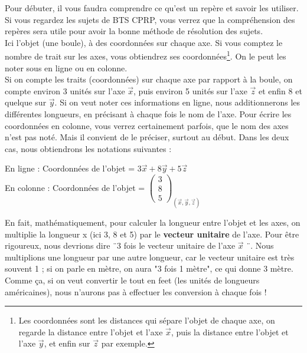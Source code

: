 \documentclass[
	11pt, %
	fleqn, %
	a4paper, %
]{LegrandOrangeBook}
\begin{document}
Pour débuter, il vous faudra comprendre ce qu'est un repère et savoir les utiliser. Si vous regardez les sujets de BTS CPRP, vous verrez que la compréhension des repères sera utile pour avoir la bonne méthode de résolution des sujets.\\


Ici l'objet (une boule), à des coordonnées sur chaque axe. Si vous comptez le {\color{blue} nombre de trait} sur les axes, vous obtiendrez ses coordonnées\footnote{Les coordonnées sont les distances qui sépare l'objet de chaque axe, on regarde la distance entre l'objet et l'axe $\vec{x}$, puis la distance entre l'objet et l'axe $\vec{y}$, et enfin sur $\vec{z}$ par exemple.}. On le peut les noter sous en ligne ou en colonne.\\


Si on compte les traits (coordonnées) sur chaque axe par rapport à la boule, on compte environ 3 unités sur l'axe $\vec{x}$, puis environ 5 unités sur l'axe $\vec{z}$ et enfin 8 et quelque sur $\vec{y}$. Si on veut noter ces informations en ligne, nous additionnerons les différentes longueurs, en précisant à chaque fois le nom de l'axe. Pour écrire les coordonnées en colonne, vous verrez certainement parfois, que le nom des axes n'est pas noté. Mais il convient de le préciser, surtout au début. Dans les deux cas, nous obtiendrons les notations suivantes :

\begin{center}
    



En ligne : Coordonnées de l'objet = $3\vec{x} + 8\vec{y} + 5\vec{z}$ \\
En colonne : Coordonnées de l'objet = {$\begin{pmatrix}
3\\
8\\
5
\end{pmatrix}_{(\vec{x} ,\vec{y} ,\vec{z})}$}



\end{center}

\begin{remark}
    En fait, mathématiquement, pour calculer la longueur entre l'objet et les axes, on multiplie la longueur x (ici 3, 8 et 5) par le \textbf{vecteur unitaire} de l'axe. Pour être rigoureux, nous devrions dire ¨3 fois le vecteur unitaire de l'axe $\vec{x}$ ¨. Nous multiplions une longueur par une autre longueur, car le vecteur unitaire est très souvent 1 ; si on parle en mètre, on aura "3 fois 1 mètre", ce qui donne 3 mètre. Comme ça, si on veut convertir le tout en feet (les unités de longueurs américaines), nous n'aurons pas à effectuer les conversion à chaque fois ! 
\end{remark}
\end{document}
